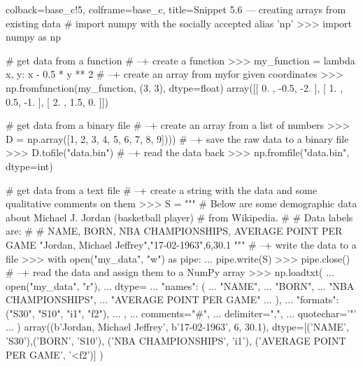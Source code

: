\documentclass[a4paper,11pt]{book}
\begin{document}
\begin{pythoncode}[linenos=true,]{colback=base_c!5, colframe=base_c, title=\sffamily Snippet 5.6 --- creating arrays from existing data}
# import numpy with the socially accepted alias 'np'
>>> import numpy as np

# get data from a function
# --+ create a function
>>> my_function = lambda x, y: x - 0.5 * y ** 2
# --+ create an array from my\fuction for given coordinates
>>> np.fromfunction(my_function, (3, 3), dtype=float)
array([[ 0. , -0.5, -2. ],
       [ 1. ,  0.5, -1. ],
       [ 2. ,  1.5,  0. ]])

# get data from a binary file
# --+ create an array from a list of numbers
>>> D = np.array([1, 2, 3, 4, 5, 6, 7, 8, 9])))
# --+ save the raw data to a binary file
>>> D.tofile("data.bin")
# --+ read the data back 
>>> np.fromfile("data.bin", dtype=int)

# get data from a text file
# --+ create a string with the data and some qualitative comments on them
>>> S = """
# Below are some demographic data about Michael J. Jordan (basketball player)
# from Wikipedia.
# 
# Data labels are:
# 
# NAME, BORN, NBA CHAMPIONSHIPS, AVERAGE POINT PER GAME
"Jordan, Michael Jeffrey","17-02-1963",6,30.1
"""
# --+ write the data to a file 
>>> with open("my_data", "w") as pipe:
...     pipe.write(S)
>>> pipe.close()
# --+ read the data and assign them to a NumPy array
>>> np.loadtxt(
...   open("my_data", "r"),
...       dtype={
...             "names": (
...                      "NAME",
...                      "BORN",
...                      "NBA CHAMPIONSHIPS",
...                      "AVERAGE POINT PER GAME"
...	                   ),
...             "formats": ("S30", "S10", "i1", "f2"),
...             },
...       comments="#",
...       delimiter=",",
...       quotechar='"'
...   )
array((b'Jordan, Michael Jeffrey', b'17-02-1963', 6, 30.1),
       dtype=[('NAME', 'S30'),('BORN', 'S10'),
             ('NBA CHAMPIONSHIPS', 'i1'),
             ('AVERAGE POINT PER GAME', '<f2')]
)
\end{pythoncode}
\end{document}
